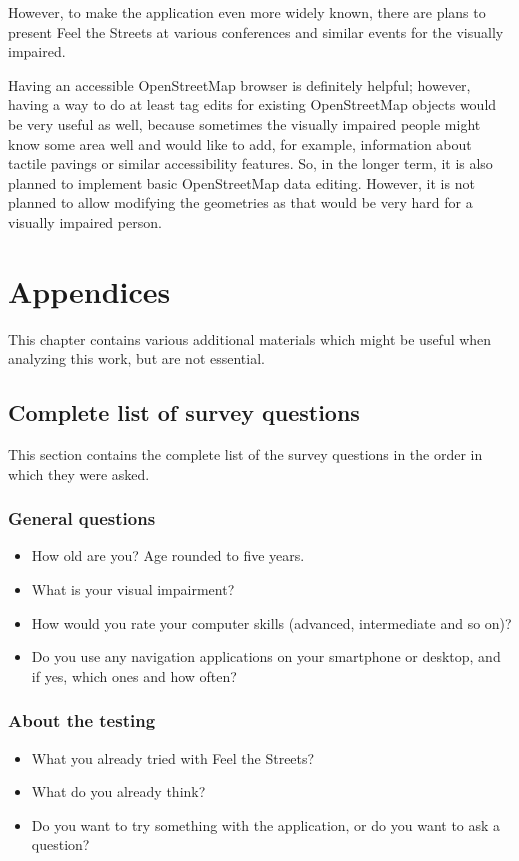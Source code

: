 \documentclass[nolof,digital]{fithesis3}
\begin{document}
However, to make the application even more widely known, there are plans to present Feel the Streets at various conferences and similar events for the visually impaired.

Having an accessible OpenStreetMap browser is definitely helpful; however, having a way to do at least tag edits for existing OpenStreetMap objects would be very useful as well, because sometimes the visually impaired people might know some area well and would like to add, for example, information about tactile pavings or similar accessibility features. So, in the longer term, it is also planned to implement basic OpenStreetMap data editing. However, it is not planned to allow modifying the geometries as that would be very hard for a visually impaired person.
\printbibliography
\appendix
\chapter{Appendices}
This chapter contains various additional materials which might be useful when analyzing this work, but are not essential.
\section{Complete list of survey questions}
This section contains the complete list of the survey questions in the order in which they were asked.
\subsection{General questions}
\begin{itemize}
\item How old are you? Age rounded to five years.
\item What is your visual impairment?
\item How would you rate your computer skills (advanced, intermediate and so on)?
\item Do you use any navigation applications on your smartphone or desktop, and if yes, which ones and how often?
\end{itemize}
\subsection{About the testing}
\begin{itemize}
\item What you already tried with Feel the Streets?
\item What do you already think?
\item Do you want to try something with the application, or do you want to ask a question?
\end{itemize}
\end{document}
